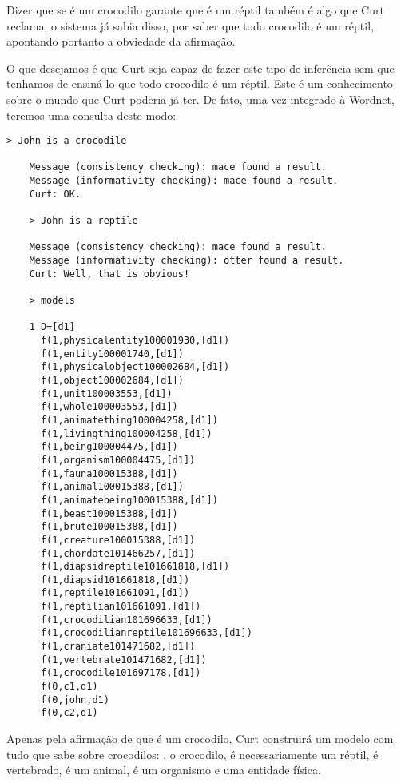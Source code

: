 	Dizer que se  é um crocodilo garante que  é um réptil também é algo que Curt reclama: o sistema já sabia disso, por saber que todo crocodilo é um réptil, apontando portanto a obviedade da afirmação.
	
	O que desejamos é que Curt seja capaz de fazer este tipo de inferência sem que tenhamos de ensiná-lo que todo crocodilo é um réptil. Este é um conhecimento sobre o mundo que Curt poderia já ter. De fato, uma vez integrado à Wordnet, teremos uma consulta deste modo:
	
	\begin{Verbatim}[fontseries=b,gobble=1]
	> John is a crocodile
	
	Message (consistency checking): mace found a result.
	Message (informativity checking): mace found a result.
	Curt: OK.
	
	> John is a reptile
	
	Message (consistency checking): mace found a result.
	Message (informativity checking): otter found a result.
	Curt: Well, that is obvious!
	
	> models
	
	1 D=[d1]
	  f(1,physicalentity100001930,[d1])
	  f(1,entity100001740,[d1])
	  f(1,physicalobject100002684,[d1])
	  f(1,object100002684,[d1])
	  f(1,unit100003553,[d1])
	  f(1,whole100003553,[d1])
	  f(1,animatething100004258,[d1])
	  f(1,livingthing100004258,[d1])
	  f(1,being100004475,[d1])
	  f(1,organism100004475,[d1])
	  f(1,fauna100015388,[d1])
	  f(1,animal100015388,[d1])
	  f(1,animatebeing100015388,[d1])
	  f(1,beast100015388,[d1])
	  f(1,brute100015388,[d1])
	  f(1,creature100015388,[d1])
	  f(1,chordate101466257,[d1])
	  f(1,diapsidreptile101661818,[d1])
	  f(1,diapsid101661818,[d1])
	  f(1,reptile101661091,[d1])
	  f(1,reptilian101661091,[d1])
	  f(1,crocodilian101696633,[d1])
	  f(1,crocodilianreptile101696633,[d1])
	  f(1,craniate101471682,[d1])
	  f(1,vertebrate101471682,[d1])
	  f(1,crocodile101697178,[d1])
	  f(0,c1,d1)
	  f(0,john,d1)
	  f(0,c2,d1)
	\end{Verbatim}
	
	Apenas pela afirmação de que  é um crocodilo, Curt construirá um modelo com tudo que sabe sobre crocodilos: , o crocodilo, é necessariamente um réptil, é vertebrado, é um animal, é um organismo e uma entidade física.
	

